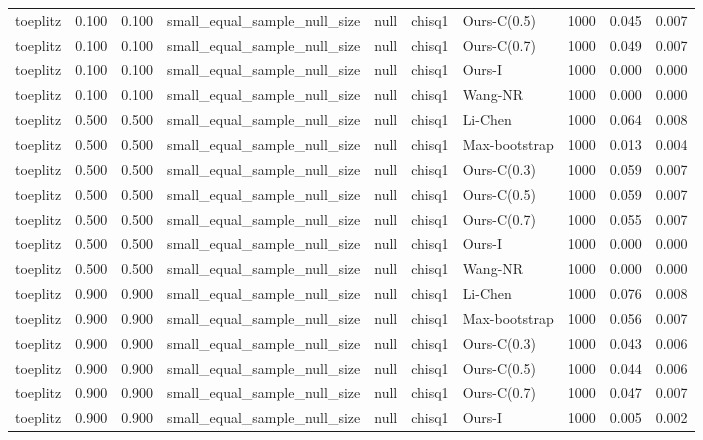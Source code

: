 \begin{tabular}{lrrllllrrr}
toeplitz & 0.100 & 0.100 & small\_equal\_sample\_null\_size & null & chisq1 & Ours-C(0.5) & 1000 & 0.045 & 0.007 \\
toeplitz & 0.100 & 0.100 & small\_equal\_sample\_null\_size & null & chisq1 & Ours-C(0.7) & 1000 & 0.049 & 0.007 \\
toeplitz & 0.100 & 0.100 & small\_equal\_sample\_null\_size & null & chisq1 & Ours-I & 1000 & 0.000 & 0.000 \\
toeplitz & 0.100 & 0.100 & small\_equal\_sample\_null\_size & null & chisq1 & Wang-NR & 1000 & 0.000 & 0.000 \\
toeplitz & 0.500 & 0.500 & small\_equal\_sample\_null\_size & null & chisq1 & Li-Chen & 1000 & 0.064 & 0.008 \\
toeplitz & 0.500 & 0.500 & small\_equal\_sample\_null\_size & null & chisq1 & Max-bootstrap & 1000 & 0.013 & 0.004 \\
toeplitz & 0.500 & 0.500 & small\_equal\_sample\_null\_size & null & chisq1 & Ours-C(0.3) & 1000 & 0.059 & 0.007 \\
toeplitz & 0.500 & 0.500 & small\_equal\_sample\_null\_size & null & chisq1 & Ours-C(0.5) & 1000 & 0.059 & 0.007 \\
toeplitz & 0.500 & 0.500 & small\_equal\_sample\_null\_size & null & chisq1 & Ours-C(0.7) & 1000 & 0.055 & 0.007 \\
toeplitz & 0.500 & 0.500 & small\_equal\_sample\_null\_size & null & chisq1 & Ours-I & 1000 & 0.000 & 0.000 \\
toeplitz & 0.500 & 0.500 & small\_equal\_sample\_null\_size & null & chisq1 & Wang-NR & 1000 & 0.000 & 0.000 \\
toeplitz & 0.900 & 0.900 & small\_equal\_sample\_null\_size & null & chisq1 & Li-Chen & 1000 & 0.076 & 0.008 \\
toeplitz & 0.900 & 0.900 & small\_equal\_sample\_null\_size & null & chisq1 & Max-bootstrap & 1000 & 0.056 & 0.007 \\
toeplitz & 0.900 & 0.900 & small\_equal\_sample\_null\_size & null & chisq1 & Ours-C(0.3) & 1000 & 0.043 & 0.006 \\
toeplitz & 0.900 & 0.900 & small\_equal\_sample\_null\_size & null & chisq1 & Ours-C(0.5) & 1000 & 0.044 & 0.006 \\
toeplitz & 0.900 & 0.900 & small\_equal\_sample\_null\_size & null & chisq1 & Ours-C(0.7) & 1000 & 0.047 & 0.007 \\
toeplitz & 0.900 & 0.900 & small\_equal\_sample\_null\_size & null & chisq1 & Ours-I & 1000 & 0.005 & 0.002 \\

\end{tabular}
